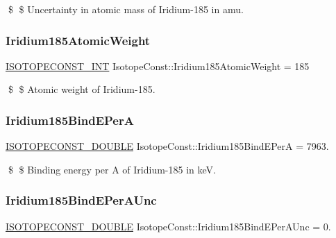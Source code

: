 \$ \$ Uncertainty in atomic mass of Iridium-\/185 in amu. \mbox{\label{group___isotope_const-_iridium-_ir185_gae38be6812e398c94f2af53bb84f930d5}} 
\subsubsection{\texorpdfstring{Iridium185\+Atomic\+Weight}{Iridium185AtomicWeight}}
{\footnotesize\ttfamily \mbox{\hyperlink{group___isotope_const-_macros_ga5f18360b3e99483a35c32d789e62621c}{I\+S\+O\+T\+O\+P\+E\+C\+O\+N\+S\+T\+\_\+\+I\+NT}} Isotope\+Const\+::\+Iridium185\+Atomic\+Weight = 185}

\$ \$ Atomic weight of Iridium-\/185. \mbox{\label{group___isotope_const-_iridium-_ir185_gabd73dd237848a741d09d4e41a93d46e4}} 
\subsubsection{\texorpdfstring{Iridium185\+Bind\+E\+PerA}{Iridium185BindEPerA}}
{\footnotesize\ttfamily \mbox{\hyperlink{group___isotope_const-_macros_ga8f45a7272ce02c0b4c65c44636ed719a}{I\+S\+O\+T\+O\+P\+E\+C\+O\+N\+S\+T\+\_\+\+D\+O\+U\+B\+LE}} Isotope\+Const\+::\+Iridium185\+Bind\+E\+PerA = 7963.}

\$ \$ Binding energy per A of Iridium-\/185 in keV. \mbox{\label{group___isotope_const-_iridium-_ir185_ga0e9c1d839749ccf3a0b7699ffd7f9413}} 
\subsubsection{\texorpdfstring{Iridium185\+Bind\+E\+Per\+A\+Unc}{Iridium185BindEPerAUnc}}
{\footnotesize\ttfamily \mbox{\hyperlink{group___isotope_const-_macros_ga8f45a7272ce02c0b4c65c44636ed719a}{I\+S\+O\+T\+O\+P\+E\+C\+O\+N\+S\+T\+\_\+\+D\+O\+U\+B\+LE}} Isotope\+Const\+::\+Iridium185\+Bind\+E\+Per\+A\+Unc = 0.}

